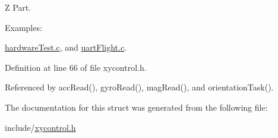 Z Part. 

\begin{Desc}
\item[Examples\-: ]\par
\hyperlink{hardware_test_8c-example}{hardware\-Test.\-c}, and \hyperlink{uart_flight_8c-example}{uart\-Flight.\-c}.\end{Desc}


Definition at line 66 of file xycontrol.\-h.



Referenced by acc\-Read(), gyro\-Read(), mag\-Read(), and orientation\-Task().



The documentation for this struct was generated from the following file\-:\begin{DoxyCompactItemize}
\item 
include/\hyperlink{xycontrol_8h}{xycontrol.\-h}\end{DoxyCompactItemize}
